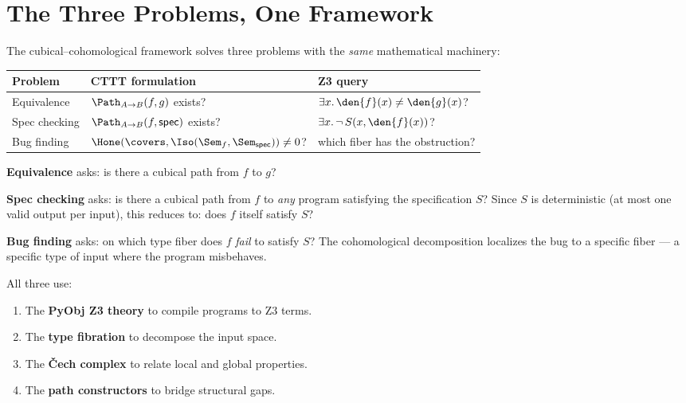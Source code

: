 
\chapter{The Three Problems, One Framework}
\label{ch:three-problems}

The cubical--cohomological framework solves three problems with the
\emph{same} mathematical machinery:

\begin{center}
\begin{tabular}{l l l}
  \textbf{Problem} & \textbf{CTTT formulation} & \textbf{Z3 query} \\
  \hline
  Equivalence & $\Path_{A \to B}(f, g)$ exists? &
    $\exists x.\, \den{f}(x) \neq \den{g}(x)$? \\
  Spec checking & $\Path_{A \to B}(f, \mathsf{spec})$ exists? &
    $\exists x.\, \lnot\,S(x, \den{f}(x))$? \\
  Bug finding & $\Hone(\covers, \Iso(\Sem_f, \Sem_\mathsf{spec})) \neq 0$? &
    which fiber has the obstruction? \\
\end{tabular}
\end{center}

\textbf{Equivalence} asks: is there a cubical path from $f$ to $g$?

\textbf{Spec checking} asks: is there a cubical path from $f$ to
\emph{any} program satisfying the specification $S$?  Since $S$ is
deterministic (at most one valid output per input), this reduces to:
does $f$ itself satisfy $S$?

\textbf{Bug finding} asks: on which type fiber does $f$ \emph{fail}
to satisfy $S$?  The cohomological decomposition localizes the bug
to a specific fiber --- a specific type of input where the program
misbehaves.

All three use:
\begin{enumerate}
  \item The \textbf{PyObj Z3 theory} to compile programs to Z3 terms.
  \item The \textbf{type fibration} to decompose the input space.
  \item The \textbf{\v{C}ech complex} to relate local and global
    properties.
  \item The \textbf{path constructors} to bridge structural gaps.
\end{enumerate}

